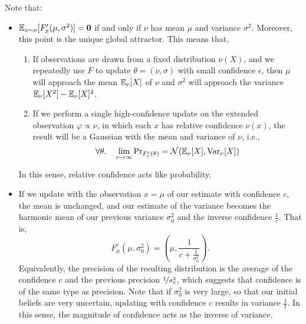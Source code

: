 \begin{example}
	Note that:
	\begin{itemize}
		\item  $\operatorname*{\mathbb{E}}_{x \sim \nu} [ F'_x(\mu,\sigma^2) ] = \mathbf{0}$ if and only if $\nu$ has mean $\mu$ and variance $\sigma^2$.
		Moreover, this point is the unique global attractor.
		This means that,
		\begin{enumerate}
			\item If observations are drawn from a fixed distribution $\nu(X)$, and we repeatedly use $F$ to update $\theta = (\nu, \sigma)$ with small confidence $\epsilon$,
			then $\mu$ will approach the mean $\operatorname*{\mathbb{E}}_{\nu}[X]$ of $\nu$
			and $\sigma^2$ will approach the variance $\operatorname*{\mathbb{E}}_{\nu}[X^2] - \operatorname*{\mathbb{E}}_{\nu}[X]^2$.

			\item If we perform a single high-confidence update on the extended observation $\varphi \propto \nu$, in which each $x$ has relative confidence $\nu(x)$, the result will be a Gaussian with the mean and variance of $\nu$, i.e.,
			\[
				\forall \theta.\quad
				\lim_{c \to \infty} \Pr\nolimits_{F_{\nu}^c(\theta)} = \mathcal N(\operatorname*{\mathbb{E}}\nolimits_{\nu}[X], {\mathrm{Var}}_{\nu}[X])
			\]
		\end{enumerate}
		In this sense, relative confidence acts like probability.

		\item
		If we update with the observation $x = \mu$ of our estimate with confidence $c$,
		the mean is unchanged, and our estimate of the variance becomes the harmonic mean of our previous variance $\sigma_0^2$ and the inverse confidence $\frac1c$.
		That is,
		\[
			F^c_\mu(\mu, \sigma_0^2) =
			\left(\mu, \frac{1}{c + \frac{1}{\sigma_0^2}} \right).
		\]
		Equivalently, the precision of the resulting distribution is the average of the confidence $c$ and the previous precision $\nicefrac{1}{\sigma_0^2}$, which suggests that confidence is of the same type as precision.
		Note that if $\sigma_0^2$ is very large, so that our initial beliefs are very uncertain, updating with confidence $c$ results in variance $\frac1t$.
		In this sense, the magnitude of confidence acts as the inverse of variance.
	\end{itemize}
\end{example}
